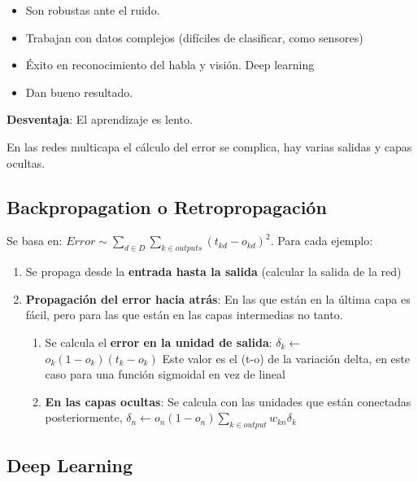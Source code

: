 \documentclass[12pt]{report} %
\begin{document}
\begin{itemize}

\item
  Son robustas ante el ruido.
\item
  Trabajan con datos complejos (difíciles de clasificar, como sensores)
\item
  Éxito en reconocimiento del habla y visión. Deep learning
\item
  Dan bueno resultado.
\end{itemize}

\textbf{Desventaja}: El aprendizaje es lento.

En las redes multicapa el cálculo del error se complica, hay varias
salidas y capas ocultas.

\subsection{Backpropagation o
Retropropagación}

Se basa en:
$Error \sim \sum _{d \in D} \sum_{k \in outputs} (t_{kd}-o_{kd})^2$.
Para cada ejemplo:

\begin{enumerate}
\def\labelenumi{\arabic{enumi}.}

\item
  Se propaga desde la \textbf{entrada hasta la salida} (calcular la
  salida de la red)
\item
  \textbf{Propagación del error hacia atrás}: En las que están en la
  última capa es fácil, pero para las que están en las capas intermedias
  no tanto.

  \begin{enumerate}
  \def\labelenumii{\arabic{enumii}.}
  
  \item
    Se calcula el \textbf{error en la unidad de salida}:
    \(\delta_k \leftarrow\) \(o_k(1-o_k)(t_k-o_k)\) Este valor es el
    (t-o) de la variación delta, en este caso para una función sigmoidal
    en vez de lineal
  \item
    \textbf{En las capas ocultas}: Se calcula con las unidades que están
    conectadas posteriormente,
    \(\delta_n \leftarrow o_n(1-o_n)\sum_{k \in output} w_{kn}\delta_k\)
  \end{enumerate}
\end{enumerate}

\subsection{Deep Learning}
\end{document}

